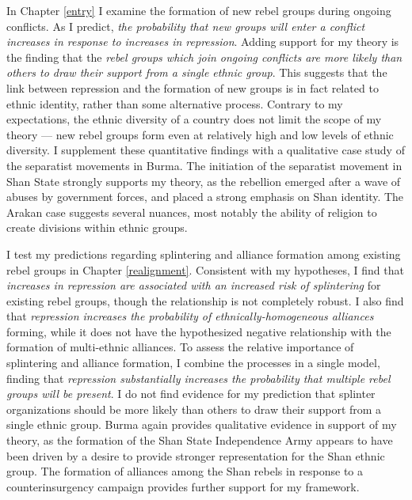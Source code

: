\documentclass[12pt,]{book}
\theoremstyle{definition}
\theoremstyle{definition}
\theoremstyle{definition}
\theoremstyle{remark}
\begin{document}
In Chapter \ref{entry} I examine the formation of new rebel groups
during ongoing conflicts. As I predict, \emph{the probability that new
groups will enter a conflict increases in response to increases in
repression}. Adding support for my theory is the finding that the
\emph{rebel groups which join ongoing conflicts are more likely than
others to draw their support from a single ethnic group}. This suggests
that the link between repression and the formation of new groups is in
fact related to ethnic identity, rather than some alternative process.
Contrary to my expectations, the ethnic diversity of a country does not
limit the scope of my theory --- new rebel groups form even at
relatively high and low levels of ethnic diversity. I supplement these
quantitative findings with a qualitative case study of the separatist
movements in Burma. The initiation of the separatist movement in Shan
State strongly supports my theory, as the rebellion emerged after a wave
of abuses by government forces, and placed a strong emphasis on Shan
identity. The Arakan case suggests several nuances, most notably the
ability of religion to create divisions within ethnic groups.

I test my predictions regarding splintering and alliance formation among
existing rebel groups in Chapter \ref{realignment}. Consistent with my
hypotheses, I find that \emph{increases in repression are associated
with an increased risk of splintering} for existing rebel groups, though
the relationship is not completely robust. I also find that
\emph{repression increases the probability of ethnically-homogeneous
alliances} forming, while it does not have the hypothesized negative
relationship with the formation of multi-ethnic alliances. To assess the
relative importance of splintering and alliance formation, I combine the
processes in a single model, finding that \emph{repression substantially
increases the probability that multiple rebel groups will be present}. I
do not find evidence for my prediction that splinter organizations
should be more likely than others to draw their support from a single
ethnic group. Burma again provides qualitative evidence in support of my
theory, as the formation of the Shan State Independence Army appears to
have been driven by a desire to provide stronger representation for the
Shan ethnic group. The formation of alliances among the Shan rebels in
response to a counterinsurgency campaign provides further support for my
framework.
\end{document}
